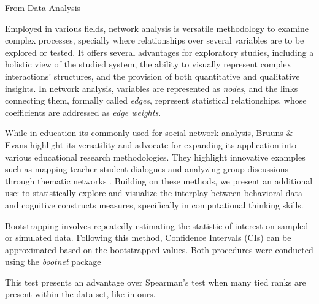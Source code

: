 From Data Analysis

Employed in various fields, network analysis is versatile methodology to examine complex processes, specially where relationships over several variables are to be explored or tested. It offers several advantages for exploratory studies, including a holistic view of the studied system, the ability to visually represent complex interactions' structures, and the provision of both quantitative and qualitative insights. In network analysis, variables are represented as \textit{nodes}, and the links connecting them, formally called \textit{edges}, represent statistical relationships, whose coefficients are addressed as \textit{edge weights}.


While in education its commonly used for social network analysis, Bruuns \& Evans \parencite*{bruun_network_2018} highlight its versatility and advocate for expanding its application into various educational research methodologies. They highlight innovative examples such as mapping teacher-student dialogues \parencite{dolin_structured_2018} and analyzing group discussions through thematic networks \parencite{lindahl_integrating_2016}. Building on these methods, we present an additional use: to statistically explore and visualize the interplay between behavioral data and cognitive constructs measures, specifically in computational thinking skills. 

Bootstrapping involves repeatedly estimating the statistic of interest on sampled or simulated data. Following this method, Confidence Intervals (CIs) can be approximated based on the bootstrapped values. Both procedures were conducted using the \textit{bootnet} package \parencite{epskamp_estimating_2018}

This test presents an advantage over Spearman's test when many tied ranks are present within the data set, like in ours. 
